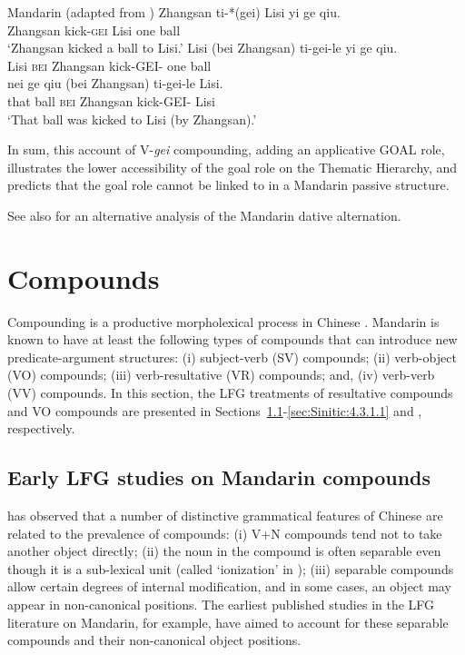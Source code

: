 \documentclass[output=paper,chinesefont,hidelinks]{langscibook}
\begin{document}
\ea%
    \label{ex:Sinitic:44}Mandarin (adapted from \citet[example~22]{Huang1993a})
\ea    \gll Zhangsan  ti-*(gei)  Lisi  yi  ge  qiu.\\
         Zhangsan    kick-\textsc{gei}  Lisi  one  {\CLF}    ball\\
    \glt`Zhangsan kicked a ball to Lisi.'
\ex    \gll *Lisi  (bei Zhangsan)  ti-gei-le    yi  ge  qiu.\\
         Lisi    {\db}\textsc{bei} Zhangsan    kick-GEI-{\PFV}  one  {\CLF}    ball\\
\ex    \gll nei   ge  qiu   (bei Zhangsan)  ti-gei-le    Lisi.\\
         that   {\CLF}  ball    {\db}\textsc{bei} Zhangsan    kick-GEI-{\PFV}  Lisi\\
    \glt `That ball was kicked to Lisi (by Zhangsan).'
    \z\z

  In sum, this account of V-\textit{gei} compounding, adding an applicative GOAL role, illustrates the lower accessibility of the goal role on the Thematic Hierarchy, and predicts that the goal role cannot be linked to {\SUBJ} in a Mandarin passive structure.

See also \citet{Her2006a} for an alternative analysis of the Mandarin dative alternation.

\section{Compounds}
\label{sec:Sinitic:4.3}

Compounding is a productive morpholexical process in Chinese \citep{HsiehHongHuang2022}. Mandarin is known to have at least the following types of compounds that can introduce new predicate-argument structures: (i) subject-verb (SV) compounds; (ii) verb-object (VO) compounds; (iii) verb-resultative (VR) compounds; and, (iv) verb-verb (VV) compounds. In this section, the LFG treatments of resultative compounds and VO compounds are presented in Sections~\ref{sec:Sinitic:4.3.1}-\ref{sec:Sinitic:4.3.1.1} and , respectively.

\subsection{Early LFG studies on Mandarin compounds}
\label{sec:Sinitic:4.3.1}

\citet{Chao1968} has observed that a number of distinctive grammatical features of Chinese are related to the prevalence of compounds: (i)  V+N compounds tend not to take another object directly; (ii) the noun in the compound is often separable even though it is a sub-lexical unit (called `ionization' in \citealt{Chao1968}); (iii) separable compounds allow certain degrees of internal modification, and in some cases, an object may appear in non-canonical positions. The earliest published studies in the LFG literature on Mandarin, \citet{Huang1985,Huang1986,Huang1988,Huang1990} for example, have aimed to account for these separable compounds and their non-canonical object positions.
\end{document}
